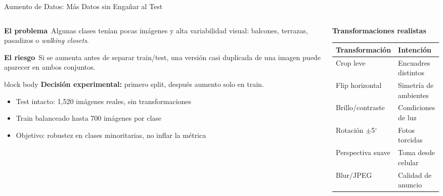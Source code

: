 \documentclass[aspectratio=169]{beamer}
\begin{document}
\begin{frame}{Aumento de Datos: M\'as Datos sin Enga\~nar al Test}
\footnotesize
\begin{columns}[T,totalwidth=\textwidth]
\begin{column}{0.52\textwidth}
\textbf{El problema}\
Algunas clases ten\'ian pocas im\'agenes y alta variabilidad visual: balcones, terrazas, pasadizos o \textit{walking closets}.

\vspace{0.18cm}
\textbf{El riesgo}\
Si se aumenta antes de separar train/test, una versi\'on casi duplicada de una imagen puede aparecer en ambos conjuntos.

\vspace{0.18cm}
\begin{beamercolorbox}[rounded=true,sep=0.08cm,wd=\linewidth]{block body}
\textbf{Decisi\'on experimental:} primero split, despu\'es aumento solo en train.
\end{beamercolorbox}

\vspace{0.12cm}
\begin{itemize}
\item Test intacto: 1,520 im\'agenes reales, sin transformaciones
\item Train balanceado hasta 700 im\'agenes por clase
\item Objetivo: robustez en clases minoritarias, no inflar la m\'etrica
\end{itemize}
\end{column}

\begin{column}{0.45\textwidth}
\textbf{Transformaciones realistas}
\begin{table}
\centering
\scriptsize
\begin{tabular}{@{}ll@{}}
\toprule
\textbf{Transformaci\'on} & \textbf{Intenci\'on} \\
\midrule
Crop leve & Encuadres distintos \\
Flip horizontal & Simetr\'ia de ambientes \\
Brillo/contraste & Condiciones de luz \\
Rotaci\'on $\pm$5$^\circ$ & Fotos torcidas \\
Perspectiva suave & Toma desde celular \\
Blur/JPEG & Calidad de anuncio \\
\bottomrule
\end{tabular}
\end{table}


\end{column}
\end{columns}
\end{frame}
\end{document}
